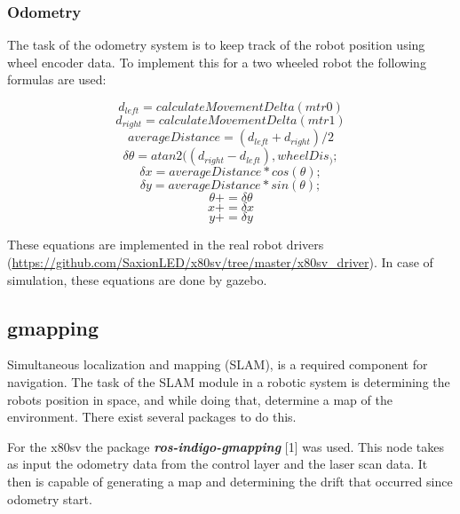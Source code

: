 \documentclass[a4paper]{article}
\newcommand{\rospackage}[1]{\textbf{\textit{ros-indigo-#1}}}
\begin{document}
\subsubsection{Odometry}
The task of the odometry system is to keep track of the robot position using wheel encoder
data. To implement this for a two wheeled robot the following formulas are used:

\begin{equation}
 d_{left} = calculateMovementDelta(mtr0)
\end{equation}
\begin{equation}
 d_{right} = calculateMovementDelta(mtr1)
\end{equation}
\begin{equation}
 averageDistance = (d_{left} + d_{right}) / 2
\end{equation}
\begin{equation}
 \delta \theta = atan2((d_{right} - d_{left}), wheelDis_);
\end{equation}
\begin{equation}
 \delta x = averageDistance * cos(\theta);
\end{equation}
\begin{equation}
 \delta y = averageDistance * sin(\theta);
\end{equation}
\begin{equation}
 \theta += \delta \theta
\end{equation}
\begin{equation}
 x += \delta x
\end{equation}
\begin{equation}
 y += \delta y
\end{equation}

These equations are implemented in the real robot drivers (\url{https://github.com/SaxionLED/x80sv/tree/master/x80sv_driver}). In case of simulation, these equations are done by gazebo.

\subsection{gmapping}

Simultaneous localization and mapping (SLAM), is a required component for navigation.
The task of the SLAM module in a robotic system is determining the robots position
in space, and while doing that, determine a map of the environment. There exist
several packages to do this.

For the x80sv the package \rospackage{gmapping} [1] was used.
This node takes as input the odometry data from the control layer and the laser scan
data. It then is capable of generating a map and determining the drift that occurred
since odometry start.
\end{document}
